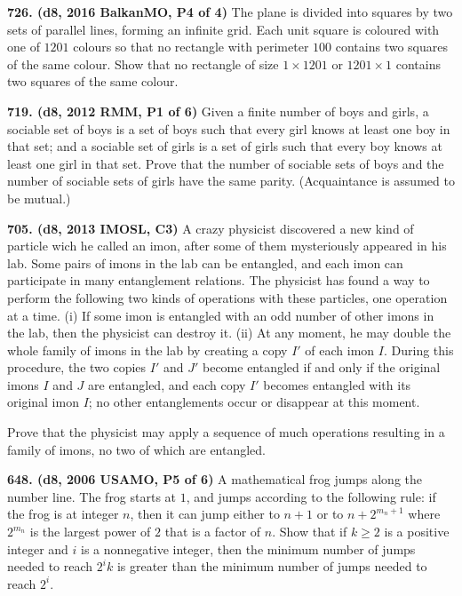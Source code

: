 \documentclass{article}
\begin{document}
\textbf{726. (\color{red}d8\color{black}, 2016 BalkanMO, P4 of 4)} The plane is divided into squares by two sets of parallel lines, forming an infinite grid. Each unit square is coloured with one of $1201$ colours so that no rectangle with perimeter $100$ contains two squares of the same colour. Show that no rectangle of size $1\times1201$ or $1201\times1$ contains two squares of the same colour.

\textbf{719. (\color{red}d8\color{black}, 2012 RMM, P1 of 6)} Given a finite number of boys and girls, a sociable set of boys is a set of boys such that every girl knows at least one boy in that set; and a sociable set of girls is a set of girls such that every boy knows at least one girl in that set. Prove that the number of sociable sets of boys and the number of sociable sets of girls have the same parity. (Acquaintance is assumed to be mutual.)

\textbf{705. (\color{red}d8\color{black}, 2013 IMOSL, C3)} A crazy physicist discovered a new kind of particle wich he called an imon, after some of them mysteriously appeared in his lab. Some pairs of imons in the lab can be entangled, and each imon can participate in many entanglement relations. The physicist has found a way to perform the following two kinds of operations with these particles, one operation at a time.
(i) If some imon is entangled with an odd number of other imons in the lab, then the physicist can destroy it.
(ii) At any moment, he may double the whole family of imons in the lab by creating a copy $I'$ of each imon $I$. During this procedure, the two copies $I'$ and $J'$ become entangled if and only if the original imons $I$ and $J$ are entangled, and each copy $I'$ becomes entangled with its original imon $I$; no other entanglements occur or disappear at this moment.

Prove that the physicist may apply a sequence of much operations resulting in a family of imons, no two of which are entangled.

\textbf{648. (\color{red}d8\color{black}, 2006 USAMO, P5 of 6)} A mathematical frog jumps along the number line. The frog starts at $1$, and jumps according to the following rule: if the frog is at integer $n$, then it can jump either to $n+1$ or to $n + 2^{m_n+1}$ where $2^{m_n}$ is the largest power of $2$ that is a factor of $n.$ Show that if $k \geq 2$ is a positive integer and $i$ is a nonnegative integer, then the minimum number of jumps needed to reach $2^ik$ is greater than the minimum number of jumps needed to reach $2^i.$
\end{document}
